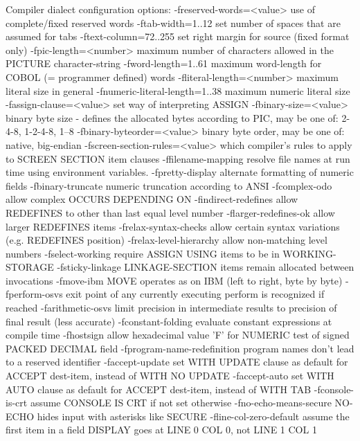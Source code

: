 Compiler dialect configuration options:
  -freserved-words=<value>	use of complete/fixed reserved words
  -ftab-width=1..12      set number of spaces that are assumed for tabs
  -ftext-column=72..255  set right margin for source (fixed format only)
  -fpic-length=<number>  maximum number of characters allowed in the PICTURE character-string
  -fword-length=1..61    maximum word-length for COBOL (= programmer defined) words
  -fliteral-length=<number>	maximum literal size in general
  -fnumeric-literal-length=1..38	maximum numeric literal size
  -fassign-clause=<value>	set way of interpreting ASSIGN
  -fbinary-size=<value>  binary byte size - defines the allocated bytes according to PIC, may be one of: 2-4-8, 1-2-4-8, 1--8
  -fbinary-byteorder=<value>	binary byte order, may be one of: native, big-endian
  -fscreen-section-rules=<value>	which compiler's rules to apply to SCREEN SECTION item clauses
  -ffilename-mapping     resolve file names at run time using environment variables.
  -fpretty-display       alternate formatting of numeric fields
  -fbinary-truncate      numeric truncation according to ANSI
  -fcomplex-odo          allow complex OCCURS DEPENDING ON
  -findirect-redefines   allow REDEFINES to other than last equal level number
  -flarger-redefines-ok  allow larger REDEFINES items
  -frelax-syntax-checks  allow certain syntax variations (e.g. REDEFINES position)
  -frelax-level-hierarchy	allow non-matching level numbers
  -fselect-working       require ASSIGN USING items to be in WORKING-STORAGE
  -fsticky-linkage       LINKAGE-SECTION items remain allocated between invocations
  -fmove-ibm             MOVE operates as on IBM (left to right, byte by byte)
  -fperform-osvs         exit point of any currently executing perform is recognized if reached
  -farithmetic-osvs      limit precision in intermediate results to precision of final result (less accurate)
  -fconstant-folding     evaluate constant expressions at compile time
  -fhostsign             allow hexadecimal value 'F' for NUMERIC test of signed PACKED DECIMAL field
  -fprogram-name-redefinition	program names don't lead to a reserved identifier
  -faccept-update        set WITH UPDATE clause as default for ACCEPT dest-item, instead of WITH NO UPDATE
  -faccept-auto          set WITH AUTO clause as default for ACCEPT dest-item, instead of WITH TAB
  -fconsole-is-crt       assume CONSOLE IS CRT if not set otherwise
  -fno-echo-means-secure	NO-ECHO hides input with asterisks like SECURE
  -fline-col-zero-default	assume the first item in a field DISPLAY goes at LINE 0 COL 0, not LINE 1 COL 1
